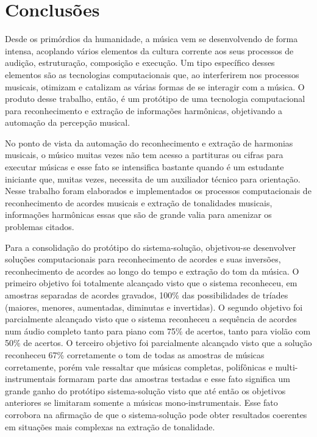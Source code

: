 \chapter{Conclusões}
\label{chap:conclusoes}
Desde os primórdios da humanidade, a música vem se desenvolvendo de forma intensa, acoplando vários elementos da cultura corrente aos seus processos de audição, estruturação, composição e execução. Um tipo específico desses elementos são as tecnologias computacionais que, ao interferirem nos processos musicais, otimizam e catalizam as várias formas de se interagir com a música. O produto desse trabalho, então, é um protótipo de uma tecnologia computacional para reconhecimento e extração de informações harmônicas, objetivando a automação da percepção musical.

No ponto de vista da automação do reconhecimento e extração de harmonias musicais, o músico muitas vezes não tem acesso a partituras ou cifras para executar músicas e esse fato se intensifica bastante quando é um estudante iniciante que, muitas vezes, necessita de um auxiliador técnico para orientação. Nesse trabalho foram elaborados e implementados os processos computacionais de reconhecimento de acordes musicais e extração de tonalidades musicais, informações harmônicas essas que são de grande valia para amenizar os problemas citados.

Para a consolidação do protótipo do sistema-solução, objetivou-se desenvolver soluções computacionais para reconhecimento de acordes e suas inversões, reconhecimento de acordes ao longo do tempo e extração do tom da música. O primeiro objetivo foi totalmente alcançado visto que o sistema reconheceu, em amostras separadas de acordes gravados, 100\% das possibilidades de tríades (maiores, menores, aumentadas, diminutas e invertidas). O segundo objetivo foi parcialmente alcançado visto que o sistema reconheceu a sequência de acordes num áudio completo tanto para piano com 75\% de acertos, tanto para violão com 50\% de acertos. O terceiro objetivo foi parcialmente alcançado visto que a solução reconheceu 67\% corretamente o tom de todas as amostras de músicas corretamente, porém vale ressaltar que músicas completas, polifônicas e multi-instrumentais formaram parte das amostras testadas e esse fato significa um grande ganho do protótipo sistema-solução visto que até então os objetivos anteriores se limitaram somente a músicas mono-instrumentais. Esse fato corrobora na afirmação de que o sistema-solução pode obter resultados coerentes em situações mais complexas na extração de tonalidade.

